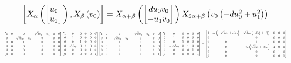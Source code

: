 \documentclass[11pt]{article}
\theoremstyle{definition}
\begin{document}
\[
\scaletoalign{\textwidth}{\left[ X_{\alpha}\left(\left[\begin{matrix}u_{0}\\u_{1}\end{matrix}\right]\right), X_{\beta}\left(v_{0}\right) \right] = X_{\alpha + \beta}\left(\left[\begin{matrix}d u_{0} v_{0}\\- u_{1} v_{0}\end{matrix}\right]\right) X_{2\alpha + \beta}\left(v_{0} \left(- d u_{0}^{2} + u_{1}^{2}\right)\right)}
\]
\[
\scaletoalign{\textwidth}{{\left[\begin{matrix}1 & 0 & 0 & \sqrt{d} u_{0} - u_{1} & 0 & 0\\0 & 1 & \sqrt{d} u_{0} + u_{1} & 0 & 0 & 0\\0 & 0 & 1 & 0 & 0 & 0\\0 & 0 & 0 & 1 & 0 & 0\\0 & 0 & 0 & 0 & 1 & 0\\0 & 0 & 0 & 0 & 0 & 1\end{matrix}\right]} {\left[\begin{matrix}1 & 0 & 0 & 0 & 0 & 0\\0 & 1 & 0 & 0 & 0 & 0\\0 & 0 & 1 & 0 & 0 & 0\\0 & \sqrt{d} v_{0} & 0 & 1 & 0 & 0\\0 & 0 & 0 & 0 & 1 & 0\\0 & 0 & 0 & 0 & 0 & 1\end{matrix}\right]} {\left[\begin{matrix}1 & 0 & 0 & - \sqrt{d} u_{0} + u_{1} & 0 & 0\\0 & 1 & - \sqrt{d} u_{0} - u_{1} & 0 & 0 & 0\\0 & 0 & 1 & 0 & 0 & 0\\0 & 0 & 0 & 1 & 0 & 0\\0 & 0 & 0 & 0 & 1 & 0\\0 & 0 & 0 & 0 & 0 & 1\end{matrix}\right]} {\left[\begin{matrix}1 & 0 & 0 & 0 & 0 & 0\\0 & 1 & 0 & 0 & 0 & 0\\0 & 0 & 1 & 0 & 0 & 0\\0 & - \sqrt{d} v_{0} & 0 & 1 & 0 & 0\\0 & 0 & 0 & 0 & 1 & 0\\0 & 0 & 0 & 0 & 0 & 1\end{matrix}\right]} = {\left[\begin{matrix}1 & v_{0} \left(- \sqrt{d} u_{1} + d u_{0}\right) & \sqrt{d} v_{0} \left(- d u_{0}^{2} + u_{1}^{2}\right) & 0 & 0 & 0\\0 & 1 & 0 & 0 & 0 & 0\\0 & 0 & 1 & 0 & 0 & 0\\0 & 0 & - v_{0} \left(\sqrt{d} u_{1} + d u_{0}\right) & 1 & 0 & 0\\0 & 0 & 0 & 0 & 1 & 0\\0 & 0 & 0 & 0 & 0 & 1\end{matrix}\right]}}
\]
\end{document}
